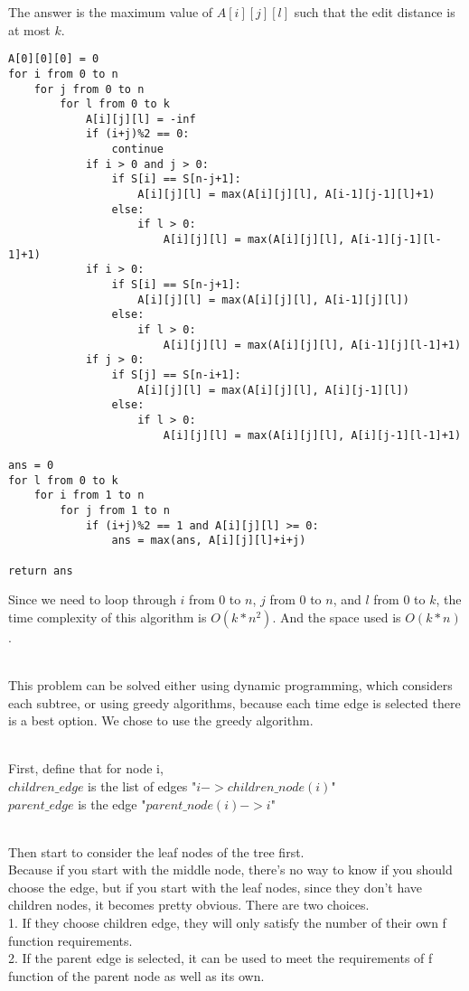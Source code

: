 \documentclass[12pt,a4paper]{article}
\newcommand{\question}[1]{\bigskip\noindent{\textbf{Q{#1} solution}}}
\begin{document}
The answer is the maximum value of $A[i][j][l]$ such that the edit distance is at most $k$. 
\begin{lstlisting}
A[0][0][0] = 0
for i from 0 to n
    for j from 0 to n
        for l from 0 to k
            A[i][j][l] = -inf
            if (i+j)%2 == 0:
                continue
            if i > 0 and j > 0:
                if S[i] == S[n-j+1]:
                    A[i][j][l] = max(A[i][j][l], A[i-1][j-1][l]+1)
                else:
                    if l > 0:
                        A[i][j][l] = max(A[i][j][l], A[i-1][j-1][l-1]+1)
            if i > 0:
                if S[i] == S[n-j+1]:
                    A[i][j][l] = max(A[i][j][l], A[i-1][j][l])
                else:
                    if l > 0:
                        A[i][j][l] = max(A[i][j][l], A[i-1][j][l-1]+1)
            if j > 0:
                if S[j] == S[n-i+1]:
                    A[i][j][l] = max(A[i][j][l], A[i][j-1][l])
                else:
                    if l > 0:
                        A[i][j][l] = max(A[i][j][l], A[i][j-1][l-1]+1)
                    
ans = 0
for l from 0 to k
    for i from 1 to n
        for j from 1 to n
            if (i+j)%2 == 1 and A[i][j][l] >= 0:
                ans = max(ans, A[i][j][l]+i+j)
                
return ans
\end{lstlisting}
Since we need to loop through $i$ from 0 to $n$, $j$ from 0 to $n$, and $l$ from 0 to $k$, the time complexity of this algorithm is $O(k*n^2)$. And the space used is $O(k*n)$.

\question{20}
\\This problem can be solved either using dynamic programming, which considers each subtree, or using greedy algorithms, because each time edge is selected there is a best option. We chose to use the greedy algorithm.


\noindent
\\First, define that for node i,
\\$children\_edge$ is the list of edges "$i->children\_node(i)$"
\\$parent\_edge$ is the edge "$parent\_node(i)->i$"


\noindent
\\Then start to consider the leaf nodes of the tree first.
\\Because if you start with the middle node, there's no way to know if you should choose the edge, but if you start with the leaf nodes, since they don't have children nodes, it becomes pretty obvious. There are two choices.
\\1. If they choose children edge, they will only satisfy the number of their own f function requirements.
\\2. If the parent edge is selected, it can be used to meet the requirements of f function of the parent node as well as its own.
\end{document}
